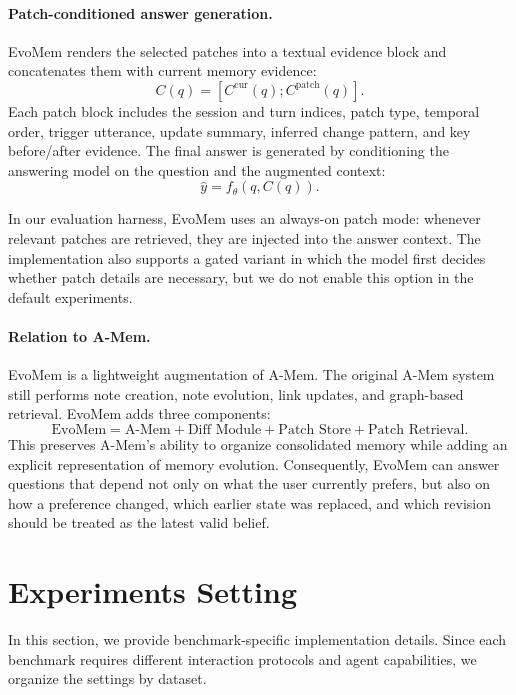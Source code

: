 \documentclass{article}
\begin{document}
\paragraph{Patch-conditioned answer generation.}
EvoMem renders the selected patches into a textual evidence block and concatenates them with current memory evidence:
\[
C(q)=\left[C^{\mathrm{cur}}(q); C^{\mathrm{patch}}(q)\right].
\]
Each patch block includes the session and turn indices, patch type, temporal order, trigger utterance, update summary, inferred change pattern, and key before/after evidence. The final answer is generated by conditioning the answering model on the question and the augmented context:
\[
\hat{y}=f_\theta(q,C(q)).
\]

In our evaluation harness, EvoMem uses an always-on patch mode: whenever relevant patches are retrieved, they are injected into the answer context. The implementation also supports a gated variant in which the model first decides whether patch details are necessary, but we do not enable this option in the default experiments.

\paragraph{Relation to A-Mem.}
EvoMem is a lightweight augmentation of A-Mem. The original A-Mem system still performs note creation, note evolution, link updates, and graph-based retrieval. EvoMem adds three components:
\[
\text{EvoMem}
=
\text{A-Mem}
+
\text{Diff Module}
+
\text{Patch Store}
+
\text{Patch Retrieval}.
\]
This preserves A-Mem's ability to organize consolidated memory while adding an explicit representation of memory evolution. Consequently, EvoMem can answer questions that depend not only on what the user currently prefers, but also on how a preference changed, which earlier state was replaced, and which revision should be treated as the latest valid belief.






\section{Experiments Setting}
\label{appendix:exp_setting}

In this section, we provide benchmark-specific implementation details. Since each benchmark requires different interaction protocols and agent capabilities, we organize the settings by dataset.
\end{document}
